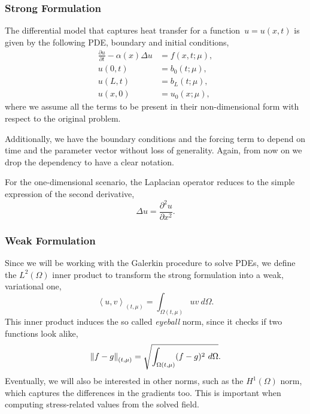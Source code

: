 \documentclass[../main.tex]{subfiles}
\newcommand{\inner}[2]{\left<#1, #2\right>}
\begin{document}
\subsubsection{Strong Formulation}
The differential model that captures heat transfer for a function~$u = u(x,t)$ is given by the following PDE, boundary and initial conditions,
\begin{subequations}
    \begin{align}
        \frac{\partial u}{\partial t} - \alpha(x) \Delta u &= f(x, t; \mu), \\
        u(0, t) &= b_0(t; \mu), \\
        u(L, t) &= b_L(t; \mu), \\
        u(x, 0) &= u_0(x; \mu),
    \end{align}
\end{subequations}
where we assume all the terms to be present in their non-dimensional form with respect to the original problem. 

Additionally, we have the boundary conditions and the forcing term to depend on time and the parameter vector without loss of generality.
Again, from now on we drop the dependency to have a clear notation.

For the one-dimensional scenario, the Laplacian operator reduces to the simple expression of the second derivative,
\begin{equation}
    \Delta u = \frac{\partial^2 u}{\partial x^2}.
\end{equation}

\subsubsection{Weak Formulation}
Since we will be working with the Galerkin procedure to solve PDEs, 
we define the $L^2(\Omega)$ inner product to transform the strong formulation into a weak, variational one,
\begin{equation}
    \inner{u}{v}_{(t, \mu)} = \int_{\Omega(t, \mu)} uv\ d\Omega.
\end{equation}
This inner product induces the so called \emph{eyeball} norm, since it checks if two functions look alike,
\begin{equation}
    \norm{f-g}_{(t, \mu)}  = \sqrt{\int_{\Omega(t, \mu)} (f - g)^2\ d\Omega}.
\end{equation}
Eventually, we will also be interested in other norms, such as the $H^1(\Omega)$ norm, which captures the differences in the gradients too.
This is important when computing stress-related values from the solved field.
\end{document}
